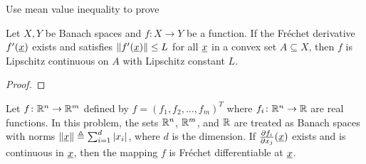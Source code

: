 Use mean value inequality to prove

\begin{lemma}
Let $X,Y$ be Banach spaces and $f \colon X \rightarrow Y$ be a function.
If the Fr\'{e}chet derivative $f'(\underline{x})$ exists and satisfies $\| f'(\underline{x})\| \leq L$ for all $\underline{x}$ in a convex set $A\subseteq X$, then $f$ is Lipschitz continuous on $A$ with Lipschitz constant $L$.
\end{lemma}

\begin{proof}
\end{proof}
\fi

\iffalse
\begin{theorem}
Let $f\colon \mathbb{R}^n \to \mathbb{R}^m$ defined by $f = (f_1,f_2,\ldots,f_m)^T$ where $f_i \colon \mathbb{R}^n \to \mathbb{R}$ are real functions.
In this problem, the sets $\mathbb{R}^n$, $\mathbb{R}^m$, and $\mathbb{R}$ are treated as Banach spaces with norms
$\|\underline{x} \| \triangleq \sum_{i=1}^d |x_i|$, where $d$ is the dimension.
If $\frac{\partial f_i}{\partial x_j} (\underline{x})$ exists and is continuous in $\underline{x}$, then the mapping $f$ is Fr\'{e}chet differentiable  at $\underline{x}$.
\end{theorem}
